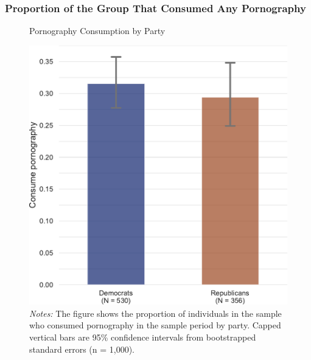 \documentclass[12pt,twoside]{article}
\begin{document}
\subsubsection{Proportion of the Group That Consumed Any Pornography}
\begin{figure}[ht]
	\centering
	\caption{Pornography Consumption by Party}
	\includegraphics[width=.5\textwidth]{figs/consume_porn_yes_no.pdf}
	\caption*{\footnotesize \emph{Notes:} 
		The figure shows the proportion of individuals in the sample who consumed pornography in the sample period by party.
		Capped vertical bars are 95\% confidence intervals from bootstrapped standard errors (n = 1,000).
	}
	\label{fig:consume_porn_yes_no}
\end{figure}
\clearpage

\FloatBarrier
\end{document}
